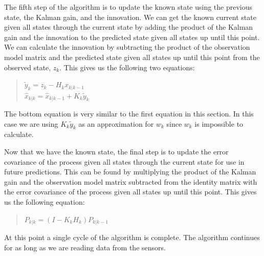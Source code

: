 \documentclass[onecolumn, draftclsnofoot,10pt, compsoc]{IEEEtran}
\begin{document}
The fifth step of the algorithm is to update the known state using the previous state, the Kalman gain, and the innovation.
We can get the known current state given all states through the current state by adding the product of the Kalman gain and the innovation to the predicted state given all states up until this point.
We can calculate the innovation by subtracting the product of the observation model matrix and the predicted state given all states up until this point from the observed state, $z_k$.
This gives us the following two equations:
\begin{quote}
  $\tilde{y}_k = z_k - H_kx_{k|k-1}$\\
  $\hat{x}_{k|k} = \hat{x}_{k|k-1} + K_k\tilde{y}_k$
\end{quote}
The bottom equation is very similar to the first equation in this section.
In this case we are using $K_k\tilde{y}_k$ as an approximation for $w_k$ since $w_k$ is impossible to calculate.

Now that we have the known state, the final step is to update the error covariance of the process given all states through the current state for use in future predictions.
This can be found by multiplying the product of the Kalman gain and the observation model matrix subtracted from the identity matrix with the error covariance of the process given all states up until this point.
This gives us the following equation:
\begin{quote}
  $P_{k|k} = (I - K_kH_k)P_{k|k-1}$
\end{quote}
At this point a single cycle of the algorithm is complete.
The algorithm continues for as long as we are reading data from the sensors.
\end{document}
